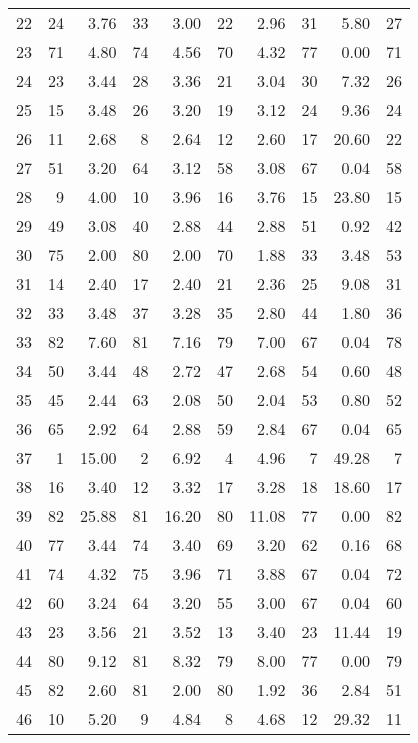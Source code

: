 \begin{table}[ht]
\begin{tabular}{rrrrrrrrrr}
  22 &  24 & 3.76 &  33 & 3.00 &  22 & 2.96 &  31 & 5.80 &  27 \\ 
  23 &  71 & 4.80 &  74 & 4.56 &  70 & 4.32 &  77 & 0.00 &  71 \\ 
  24 &  23 & 3.44 &  28 & 3.36 &  21 & 3.04 &  30 & 7.32 &  26 \\ 
  25 &  15 & 3.48 &  26 & 3.20 &  19 & 3.12 &  24 & 9.36 &  24 \\ 
  26 &  11 & 2.68 &   8 & 2.64 &  12 & 2.60 &  17 & 20.60 &  22 \\ 
  27 &  51 & 3.20 &  64 & 3.12 &  58 & 3.08 &  67 & 0.04 &  58 \\ 
  28 &   9 & 4.00 &  10 & 3.96 &  16 & 3.76 &  15 & 23.80 &  15 \\ 
  29 &  49 & 3.08 &  40 & 2.88 &  44 & 2.88 &  51 & 0.92 &  42 \\ 
  30 &  75 & 2.00 &  80 & 2.00 &  70 & 1.88 &  33 & 3.48 &  53 \\ 
  31 &  14 & 2.40 &  17 & 2.40 &  21 & 2.36 &  25 & 9.08 &  31 \\ 
  32 &  33 & 3.48 &  37 & 3.28 &  35 & 2.80 &  44 & 1.80 &  36 \\ 
  33 &  82 & 7.60 &  81 & 7.16 &  79 & 7.00 &  67 & 0.04 &  78 \\ 
  34 &  50 & 3.44 &  48 & 2.72 &  47 & 2.68 &  54 & 0.60 &  48 \\ 
  35 &  45 & 2.44 &  63 & 2.08 &  50 & 2.04 &  53 & 0.80 &  52 \\ 
  36 &  65 & 2.92 &  64 & 2.88 &  59 & 2.84 &  67 & 0.04 &  65 \\ 
  37 &   1 & 15.00 &   2 & 6.92 &   4 & 4.96 &   7 & 49.28 &   7 \\ 
  38 &  16 & 3.40 &  12 & 3.32 &  17 & 3.28 &  18 & 18.60 &  17 \\ 
  39 &  82 & 25.88 &  81 & 16.20 &  80 & 11.08 &  77 & 0.00 &  82 \\ 
  40 &  77 & 3.44 &  74 & 3.40 &  69 & 3.20 &  62 & 0.16 &  68 \\ 
  41 &  74 & 4.32 &  75 & 3.96 &  71 & 3.88 &  67 & 0.04 &  72 \\ 
  42 &  60 & 3.24 &  64 & 3.20 &  55 & 3.00 &  67 & 0.04 &  60 \\ 
  43 &  23 & 3.56 &  21 & 3.52 &  13 & 3.40 &  23 & 11.44 &  19 \\ 
  44 &  80 & 9.12 &  81 & 8.32 &  79 & 8.00 &  77 & 0.00 &  79 \\ 
  45 &  82 & 2.60 &  81 & 2.00 &  80 & 1.92 &  36 & 2.84 &  51 \\ 
  46 &  10 & 5.20 &   9 & 4.84 &   8 & 4.68 &  12 & 29.32 &  11 \\ 

\end{tabular}
\end{table}
